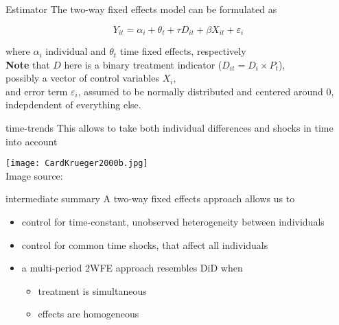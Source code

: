 \documentclass[aspectratio=169]{beamer}
\begin{document}
		\begin{frame}{Estimator}
			The two-way fixed effects model can be formulated as
			\\ \vspace*{.25cm}

			\begin{equation}
				Y_{it} = \alpha_i + \theta_t + \tau D_{it} + \beta X_{it} + \varepsilon_i
			\end{equation}

			\vspace*{.25cm}
			where $\alpha_i$ individual and $\theta_t$ time fixed effects, respectively \\
			\textbf{Note} that $D$ here is a binary treatment indicator ($D_{it}=D_{i} \times P_{t}$), \\ possibly a vector of control variables $X_i$, \\
			and error term $\varepsilon_i$, assumed to be normally distributed and centered around $0$, indepdendent of everything else.
		\end{frame}

		\begin{frame}{time-trends}
			This allows to take both individual differences and shocks in time into account
			\begin{center}
				\texttt{[image: CardKrueger2000b.jpg]}
				\\ \tiny{ Image source: \cite{Card2000}}
			\end{center}
		\end{frame}

		\begin{frame}{intermediate summary}
			A two-way fixed effects approach allows us to \\ \vspace*{.5cm}
			\begin{itemize}
				\item control for time-constant, unobserved heterogeneity between individuals
				\item control for common time shocks, that affect all individuals
				\item a multi-period 2WFE approach resembles DiD when
				\begin{itemize}
					\item treatment is simultaneous
					\item effects are homogeneous
				\end{itemize}
			\end{itemize}
		\end{frame}
\end{document}

